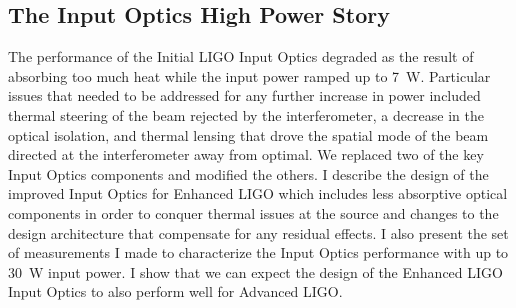 


\subsection{The Input Optics High Power Story} 
The performance of the Initial LIGO Input Optics degraded as the
result of absorbing too much heat while the input power ramped up to
7~W. Particular issues that needed to be addressed for any further
increase in power included thermal steering of the beam rejected by
the interferometer, a decrease in the optical isolation, and thermal
lensing that drove the spatial mode of the beam directed at the
interferometer away from optimal. We replaced two of the key Input
Optics components and modified the others. I describe the design of
the improved Input Optics for Enhanced LIGO which includes less
absorptive optical components in order to conquer thermal issues at
the source and changes to the design architecture that compensate for
any residual effects. I also present the set of measurements I made to
characterize the Input Optics performance with up to 30~W input
power. I show that we can expect the design of the Enhanced LIGO Input
Optics to also perform well for Advanced LIGO.



